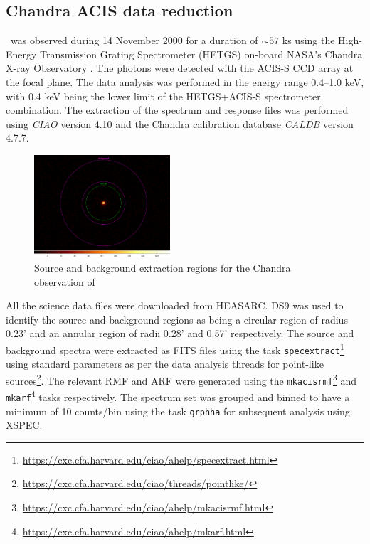     \subsection{Chandra ACIS data reduction}
    	\source\ was observed during 14 November 2000 for a duration of $\sim 57$ ks using the High-Energy Transmission Grating Spectrometer (HETGS) on-board NASA's Chandra X-ray Observatory \cite{beardaChandra2002AA}. The photons were detected with the ACIS-S CCD array at the focal plane. The data analysis was performed in the energy range 0.4--1.0 keV, with 0.4 keV being the lower limit of the HETGS+ACIS-S spectrometer combination. The extraction of the spectrum and response files was performed using \textit{CIAO} version 4.10 and the Chandra calibration database \textit{CALDB} version 4.7.7.
    	\begin{figure}[!htb]
	        \centering
	        \includegraphics[width=0.45\textwidth]{figures/rx-j0925-7-4758_644_src-bkg.png}
	        \caption{Source and background extraction regions for the Chandra observation of \source}
	        \label{fig:src-bkg:acis}
	    \end{figure}
    	
    	All the science data files were downloaded from HEASARC. DS9 was used to identify the source and background regions as being a circular region of radius 0.23' and an annular region of radii 0.28' and 0.57' respectively. The source and background spectra were extracted as FITS files using the task \texttt{specextract}\footnote{\url{https://cxc.cfa.harvard.edu/ciao/ahelp/specextract.html}} using standard parameters as per the data analysis threads for point-like sources\footnote{\url{https://cxc.cfa.harvard.edu/ciao/threads/pointlike/}}. The relevant RMF and ARF were generated using the \texttt{mkacisrmf}\footnote{\url{https://cxc.cfa.harvard.edu/ciao/ahelp/mkacisrmf.html}} and \texttt{mkarf}\footnote{\url{https://cxc.cfa.harvard.edu/ciao/ahelp/mkarf.html}} tasks respectively. The spectrum set was grouped and binned to have a minimum of 10 counts/bin using the task \texttt{grphha} for subsequent analysis using XSPEC.
    
